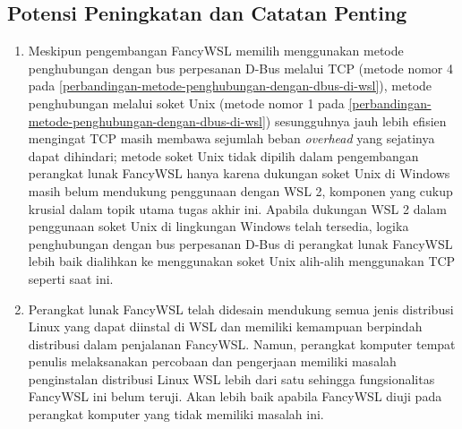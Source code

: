 \subsection{Potensi Peningkatan dan Catatan Penting}

\begin{enumerate}
    \item Meskipun pengembangan FancyWSL memilih menggunakan metode penghubungan dengan bus perpesanan D-Bus melalui TCP (metode nomor 4 pada \autoref{perbandingan-metode-penghubungan-dengan-dbus-di-wsl}), metode penghubungan melalui soket Unix (metode nomor 1 pada \autoref{perbandingan-metode-penghubungan-dengan-dbus-di-wsl}) sesungguhnya jauh lebih efisien mengingat TCP masih membawa sejumlah beban \textit{overhead} yang sejatinya dapat dihindari; metode soket Unix tidak dipilih dalam pengembangan perangkat lunak FancyWSL hanya karena dukungan soket Unix di Windows masih belum mendukung penggunaan dengan WSL 2, komponen yang cukup krusial dalam topik utama tugas akhir ini. Apabila dukungan WSL 2 dalam penggunaan soket Unix di lingkungan Windows telah tersedia, logika penghubungan dengan bus perpesanan D-Bus di perangkat lunak FancyWSL lebih baik dialihkan ke menggunakan soket Unix alih-alih menggunakan TCP seperti saat ini.

    \item Perangkat lunak FancyWSL telah didesain mendukung semua jenis distribusi Linux yang dapat diinstal di WSL dan memiliki kemampuan berpindah distribusi dalam penjalanan FancyWSL. Namun, perangkat komputer tempat penulis melaksanakan percobaan dan pengerjaan memiliki masalah penginstalan distribusi Linux WSL lebih dari satu sehingga fungsionalitas FancyWSL ini belum teruji. Akan lebih baik apabila FancyWSL diuji pada perangkat komputer yang tidak memiliki masalah ini.
\end{enumerate}

